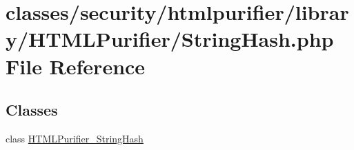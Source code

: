 \hypertarget{StringHash_8php}{\section{classes/security/htmlpurifier/library/\+H\+T\+M\+L\+Purifier/\+String\+Hash.php File Reference}
\label{StringHash_8php}
}
\subsection*{Classes}
\begin{DoxyCompactItemize}
\item 
class \hyperlink{classHTMLPurifier__StringHash}{H\+T\+M\+L\+Purifier\+\_\+\+String\+Hash}
\end{DoxyCompactItemize}
